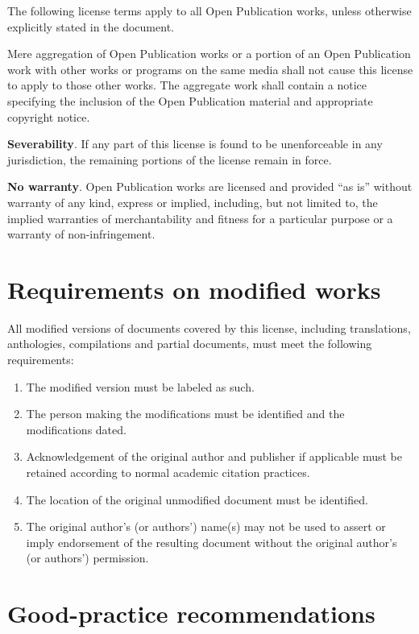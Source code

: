 The following license terms apply to all Open Publication works,
unless otherwise explicitly stated in the document.

Mere aggregation of Open Publication works or a portion of an Open
Publication work with other works or programs on the same media shall
not cause this license to apply to those other works. The aggregate
work shall contain a notice specifying the inclusion of the Open
Publication material and appropriate copyright notice.

\textbf{Severability}. If any part of this license is found to be
unenforceable in any jurisdiction, the remaining portions of the
license remain in force.

\textbf{No warranty}. Open Publication works are licensed and provided
``as is'' without warranty of any kind, express or implied, including,
but not limited to, the implied warranties of merchantability and
fitness for a particular purpose or a warranty of non-infringement.

\section{Requirements on modified works}

All modified versions of documents covered by this license, including
translations, anthologies, compilations and partial documents, must
meet the following requirements:

\begin{enumerate}
\item The modified version must be labeled as such.
\item The person making the modifications must be identified and the
  modifications dated.
\item Acknowledgement of the original author and publisher if
  applicable must be retained according to normal academic citation
  practices.
\item The location of the original unmodified document must be
  identified.
\item The original author's (or authors') name(s) may not be used to
  assert or imply endorsement of the resulting document without the
  original author's (or authors') permission.
\end{enumerate}

\section{Good-practice recommendations}

